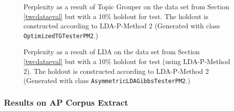 \documentclass[10pt, a4paper, oneside]{article}
\begin{document}
\begin{figure}
\caption{Perplexity as a result of Topic Grouper on the data set from Section \ref{twcdataeval} but with a 10\% holdout for test. The holdout is constructed according to LDA-P-Method 2 (Generated with class \texttt{OptimizedTGTesterPM2}.)}
\label{perplexity3}
\end{figure}

\begin{figure}
\caption{Perplexity as a result of LDA on the data set from Section \ref{twcdataeval} but with a 10\% holdout for test (using LDA-P-Method 2). The holdout is constructed according to LDA-P-Method 2 (Generated with class \texttt{AsymmetricLDAGibbsTesterPM2}.)}
\label{perplexity4}
\end{figure}

\subsubsection{Results on AP Corpus Extract}
\end{document}
